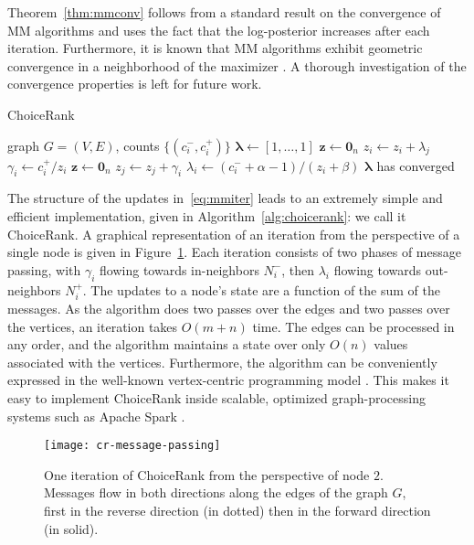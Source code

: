 Theorem~\ref{thm:mmconv} follows from a standard result on the convergence of MM algorithms and uses the fact that the log-posterior increases after each iteration.
Furthermore, it is known that MM algorithms exhibit geometric convergence in a neighborhood of the maximizer \citep{lange2000optimization}.
A thorough investigation of the convergence properties is left for future work.

\begin{algorithm}[t]
  \caption{ChoiceRank}
  \label{alg:choicerank}
  \begin{algorithmic}[1]
    \Require graph $G = (V, E)$, counts $\{ (c^-_i, c^+_i) \}$
    \State $\bm{\lambda} \gets [1, \ldots, 1]$
    \Repeat
      \State $\bm{z} \gets \bm{0}_n$
       $z_i \gets z_i + \lambda_j$
       $\gamma_i \gets c^+_i / z_i$
      \State $\bm{z} \gets \bm{0}_n$
       $z_j \gets z_j + \gamma_i$
       $\lambda_i \gets (c^-_i + \alpha - 1) / (z_i + \beta)$
    \Until $\bm{\lambda}$ has converged
  \end{algorithmic}
\end{algorithm}

The structure of the updates in~\eqref{eq:mmiter} leads to an extremely simple and efficient implementation, given in Algorithm~\ref{alg:choicerank}: we call it ChoiceRank.
A graphical representation of an iteration from the perspective of a single node is given in Figure~\ref{fig:msgpassing}.
Each iteration consists of two phases of message passing, with $\gamma_i$ flowing towards in-neighbors $N^-_i$, then $\lambda_i$ flowing towards out-neighbors $N^+_i$.
The updates to a node's state are a function of the sum of the messages.
As the algorithm does two passes over the edges and two passes over the vertices, an iteration takes $O(m + n)$ time.
The edges can be processed in any order, and the algorithm maintains a state over only $O(n)$ values associated with the vertices.
Furthermore, the algorithm can be conveniently expressed in the well-known vertex-centric programming model \citep{malewicz2010pregel}.
This makes it easy to implement ChoiceRank inside scalable, optimized graph-processing systems such as Apache Spark \citep{gonzalez2014graphx}.

\begin{figure}[t]
  \centering
  \texttt{[image: cr-message-passing]}
  \caption{One iteration of ChoiceRank from the perspective of node $2$.
  Messages flow in both directions along the edges of the graph $G$, first in the reverse direction (in dotted) then in the forward direction (in solid).}
  \label{fig:msgpassing}
\end{figure}

